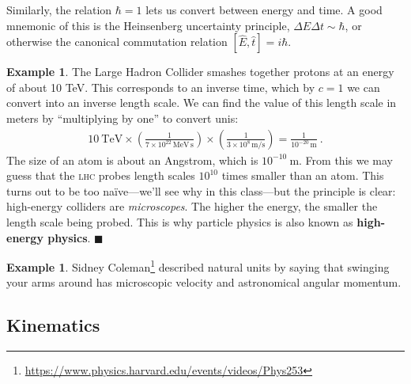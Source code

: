 \documentclass[12pt]{article}
\numberwithin{equation}{section}    %
\newcommand{\acro}[1]{\textsc{\MakeLowercase{#1}}}
\theoremstyle{definition}
\newtheorem{eg}[theorem]{Example}
\begin{document}
Similarly, the relation $\hbar = 1$ lets us convert between energy and time. A good mnemonic of this is the Heinsenberg uncertainty principle, $\Delta E \Delta t\sim \hbar$, or otherwise the canonical commutation relation $[\hat E, \hat t] = i\hbar$. 

\begin{eg}The Large Hadron Collider smashes together protons at an energy of about 10 TeV. This corresponds to an inverse time, which by $c=1$ we can convert into an inverse length scale. We can find the value of this length scale in meters by ``multiplying by one'' to convert unis:
\begin{align}
	10~\text{TeV} \times
	\left(\frac{1}{7\times 10^{22}\,\text{MeV}\,\text{s}}\right)
	\times\left(\frac{1}{3\times 10^{8}\,\text{m}/\text{s}}\right)
	= 
	\frac{1}{10^{-20}\,\text{m}} \ .
\end{align}
The size of an atom is about an Angstrom, which is $10^{-10}~$m. From this we may guess that the \acro{LHC} probes length scales $10^{10}$ times smaller than an atom. This turns out to be too na\"ive---we'll see why in this class---but the principle is clear: high-energy colliders are \emph{microscopes}. The higher the energy, the smaller the length scale being probed. This is why particle physics is also known as \textbf{high-energy physics}. 
	$\blacksquare$
\end{eg}

\begin{eg}
Sidney Coleman\footnote{\url{https://www.physics.harvard.edu/events/videos/Phys253}} described natural units by saying that swinging your arms around has microscopic velocity and astronomical  angular momentum.
\end{eg}




\subsection{Kinematics}
\end{document}
